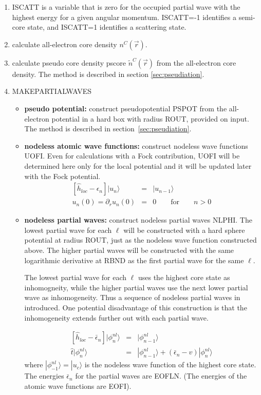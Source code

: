 \documentclass[11pt,a4paper]{report}
\begin{document}
\begin{enumerate}
\item ISCATT is a variable that is zero for the occupied partial wave
  with the highest energy for a given angular momentum. ISCATT=-1
  identifies a semi-core state, and ISCATT=1 identifies a scattering
  state.
\item calculate all-electron core density $n^C(\vec{r})$.
\item calculate pseudo core density pscore $\tilde{n}^C(\vec{r})$ from
  the all-electron core density. The method is described in section
  \ref{sec:pseudiation}.
\item MAKEPARTIALWAVES
\begin{itemize}
\item \textbf{pseudo potential:} construct pseudopotential PSPOT from
  the all-electron potential in a hard box with radius ROUT, provided
  on input. The method is described in section~\ref{sec:pseudiation}.
%
\item \textbf{nodeless atomic wave functions:} construct nodeless wave
  functions UOFI.  Even for calculations with a Fock contribution,
  UOFI will be determined here only for the local potential and it
  will be updated later with the Fock potential.
\begin{eqnarray*}
\left[\hat{h}_{loc}-\epsilon_n\right]|u_n\rangle&=&|u_{n-1}\rangle
\\
u_n(0)=\partial_r u_n(0)&=&0\qquad\text{for}\qquad n>0
\end{eqnarray*}
%
\item \textbf{nodeless partial waves:} construct nodeless partial
  waves NLPHI.  The lowest partial wave for each $\ell$ will be
  constructed with a hard sphere potential at radius ROUT, just as the
  nodeless wave function constructed above.  The higher partial waves
  will be constructed with the same logarithmic derivative at RBND as
  the first partial wave for the same $\ell$.

  The lowest partial wave for each $\ell$ uses the highest core state
  as inhomogneity, while the higher partial waves use the next lower
  partial wave as inhomogeneity. Thus a sequence of nodeless partial
  waves in introduced. One potential disadvantage of this
  construction is that the inhomogeneity extends further out with each
  partial wave.

\begin{eqnarray*}
\left[\hat{h}_{loc}-\bar{\epsilon}_n\right]|\phi^{nl}_{n}\rangle&=&
|\phi^{nl}_{n-1}\rangle
\\
\hat{t}|\phi^{nl}_n\rangle
&=&|\phi^{nl}_{n-1}\rangle+(\bar{\epsilon}_n-v)|\phi^{nl}_n\rangle
\end{eqnarray*}
where $|\phi^{nl}_{-1}\rangle=|u_c\rangle$ is the nodeless wave
function of the highest core state. The energies $\bar{\epsilon}_n$
for the partial waves are EOFLN. (The energies of the atomic wave
functions are EOFI).


\end{itemize}
\end{enumerate}
\end{document}
